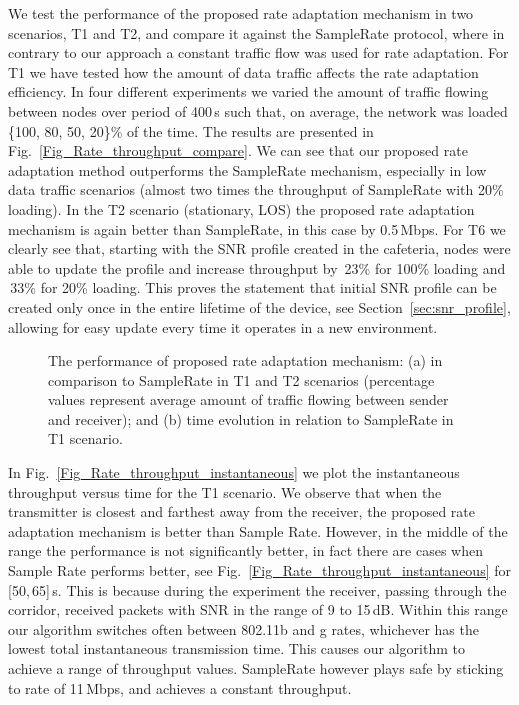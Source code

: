 \documentclass[11pt,draftclsnofoot,journal,onecolumn]{IEEEtran}
\begin{document}
We test the performance of the proposed rate adaptation mechanism in two scenarios, T1 and T2, and compare it against the SampleRate protocol, where in contrary to our approach a constant traffic flow was used for rate adaptation. For T1 we have tested how the amount of data traffic affects the rate adaptation efficiency. In four different experiments we varied the amount of traffic flowing between nodes over period of 400\,s such that, on average, the network was loaded \{100, 80, 50, 20\}\% of the time. The results are presented in Fig.~\ref{Fig_Rate_throughput_compare}. We can see that our proposed rate adaptation method outperforms the SampleRate mechanism, especially in low data traffic scenarios (almost two times the throughput of SampleRate with 20\% loading). In the T2 scenario (stationary, LOS) the proposed rate adaptation mechanism is again better than SampleRate, in this case by 0.5\,Mbps. For T6 we clearly see that, starting with the SNR profile created in the cafeteria, nodes were able to update the profile and increase throughput by \,23\% for 100\% loading and \,33\% for 20\% loading. This proves the statement that initial SNR profile can be created only once in the entire lifetime of the device, see Section~\ref{sec:snr_profile}, allowing for easy update every time it operates in a new environment.
\begin{figure}
\centering
{}
\caption{The performance of proposed rate adaptation mechanism: (a) in comparison to SampleRate in T1 and T2 scenarios (percentage values represent average amount of traffic flowing between sender and receiver); and (b) time evolution in relation to SampleRate in T1 scenario.}
\end{figure}

In Fig.~\ref{Fig_Rate_throughput_instantaneous} we plot the instantaneous throughput versus time for the T1 scenario. We observe that when the transmitter is closest and farthest away from the receiver, the proposed rate adaptation mechanism is better than Sample Rate. However, in the middle of the range the performance is not significantly better, in fact there are cases when Sample Rate performs better, see Fig.~\ref{Fig_Rate_throughput_instantaneous} for [50,\,65]\,s. This is because during the experiment the receiver, passing through the corridor, received packets with SNR in the range of 9 to 15\,dB.  Within this range our algorithm switches often between 802.11b and g rates, whichever has the lowest total instantaneous transmission time. This causes our algorithm to achieve a range of throughput values. SampleRate however plays safe by sticking to rate of 11\,Mbps, and achieves a constant throughput.
\end{document}
